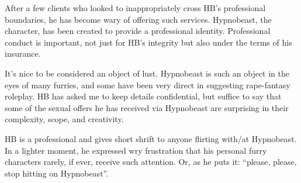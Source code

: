 After a few clients who looked to inappropriately cross HB's professional boundaries, he has become wary of offering such services. Hypnobeast, the character, has been created to provide a professional identity. Professional conduct is important, not just for HB's integrity but also under the terms of his insurance.

It's nice to be considered an object of lust. Hypnobeast is such an object in the eyes of many furries, and some have been very direct in suggesting rape-fantasy roleplay. HB has asked me to keep details confidential, but suffice to say that some of the sexual offers he has received via Hypnobeast are surprising in their complexity, scope, and creativity.

HB is a professional and gives short shrift to anyone flirting with/at Hypnobeast. In a lighter moment, he expressed wry frustration that his personal furry characters rarely, if ever, receive such attention. Or, as he puts it: “please, please, stop hitting on Hypnobeast”.
